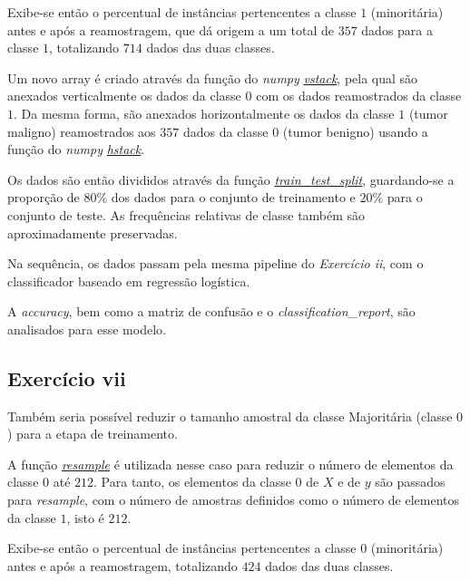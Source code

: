 Exibe-se então o percentual de instâncias pertencentes a classe $1$ (minoritária) antes e após a reamostragem, que dá origem a um total de $357$ dados para a classe $1$, totalizando $714$ dados das duas classes.

Um novo array é criado através da função do \textit{numpy} \href{https://numpy.org/doc/stable/reference/generated/numpy.vstack.html}{\textit{vstack}}, pela qual são anexados verticalmente os dados da classe $0$ com os dados reamostrados da classe $1$.  Da mesma forma, são anexados horizontalmente os dados da classe $1$ (tumor maligno) reamostrados aos $357$ dados da classe $0$ (tumor benigno) usando a função do \textit{numpy} \href{https://numpy.org/doc/stable/reference/generated/numpy.hstack.html}{\textit{hstack}}.

Os dados são então divididos através da função \href{https://scikit-learn.org/stable/modules/generated/sklearn.model_selection.train_test_split.html}{\textit{train\_test\_split}}, guardando-se a proporção de $80\%$ dos dados para o conjunto de treinamento e $20\%$ para o conjunto de teste. As frequências relativas de classe também são aproximadamente preservadas.

Na sequência, os dados passam pela mesma pipeline do \textit{Exercício ii}, com o classificador baseado em regressão logística. 

A \textit{accuracy}, bem como a  matriz de confusão  e o \textit{classification\_report}, são analisados para esse modelo.

\subsection{Exercício vii}

Também seria possível reduzir o tamanho amostral da classe Majoritária (classe $0$) para a etapa de treinamento.

A função \href{https://scikit-learn.org/stable/modules/generated/sklearn.utils.resample.html}{\textit{resample}} é utilizada nesse caso para reduzir o número de elementos da classe $0$ até $212$. Para tanto, os elementos da classe $0$ de $X$ e de $y$ são passados para \textit{resample}, com o número de amostras definidos como o número de elementos da classe $1$, isto é $212$.

Exibe-se então o percentual de instâncias pertencentes a classe $0$ (minoritária) antes e após a reamostragem, totalizando $424$ dados das duas classes.

